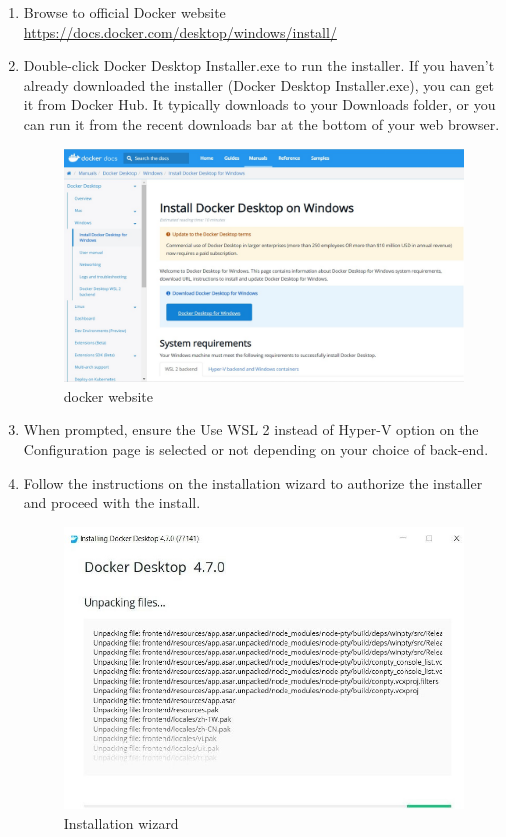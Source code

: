 \documentclass[12pt]{article}
\begin{document}
\begin{enumerate}
	\item Browse to official Docker website  \href{https://docs.docker.com/desktop/windows/install/}{https://docs.docker.com/desktop/windows/install/}
	\item Double-click Docker Desktop Installer.exe to run the installer. If you haven’t already downloaded the installer (Docker Desktop Installer.exe), you can get it from Docker Hub. It typically downloads to your Downloads folder, or you can run it from the recent downloads bar at the bottom of your web browser.

\begin{figure}[H]
\centering
\includegraphics[scale=0.5]{fig11}
\caption{docker website}
\vspace{0.6\baselineskip}
\end{figure}	
	
	
	\item When prompted, ensure the Use WSL 2 instead of Hyper-V option on the Configuration page is selected or not depending on your choice of back-end.
	
	\item Follow the instructions on the installation wizard to authorize the installer and proceed with the install.
	
\begin{figure}[H]
\centering
\includegraphics[scale=0.8]{fig12}
\caption{Installation wizard}
\vspace{0.6\baselineskip}
\end{figure}	
	

\end{enumerate}
\end{document}
